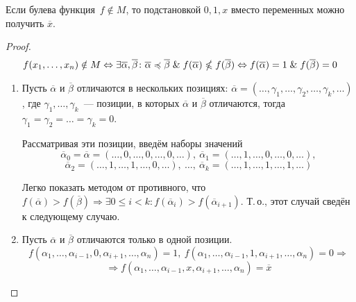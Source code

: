 \begin{lemma}
Если булева функция~$f \notin M$, то подстановкой $0, 1, x$ вместо переменных можно получить $\overline x$.
\end{lemma}
\begin{proof}
\begin{equation*}
f(x_1, \ldots, x_n) \notin M \Leftrightarrow
\exists \overline\alpha, \overline\beta \colon
\overline\alpha \preccurlyeq \overline\beta \mathrel{\&} f(\overline\alpha) \nleqslant f(\overline\beta) \Leftrightarrow
f(\overline\alpha) = 1 \mathrel{\&} f(\overline\beta) = 0
\end{equation*}
\begin{enumerate}
	\item Пусть $\overline\alpha$ и $\overline\beta$ отличаются в нескольких позициях:
	$\overline\alpha = (\ldots, \gamma_1, \ldots, \gamma_2, \ldots, \gamma_k, \ldots)$, где
	$\gamma_1, \ldots, \gamma_k$~--- позиции, в которых $\overline\alpha$ и $\overline\beta$ отличаются, тогда $\gamma_1 = \gamma_2 = \ldots = \gamma_k = 0$.
	
	Рассматривая эти позиции, введём наборы значений
	\begin{equation*}
	\overline\alpha_0 = \overline\alpha = (\ldots, 0, \ldots, 0, \ldots, 0, \ldots), \
	\overline\alpha_1 = (\ldots, 1, \ldots, 0, \ldots, 0, \ldots),
	\end{equation*}
	\begin{equation*}
	\overline\alpha_2 = (\ldots, 1, \ldots, 1, \ldots, 0, \ldots), \ \ldots, \
	\overline\alpha_k = (\ldots, 1, \ldots, 1, \ldots, 1, \ldots)
	\end{equation*}
	
	Легко показать методом от противного, что $f(\overline\alpha) > f(\overline\beta) \Rightarrow
	\exists 0 \leqslant i < k \colon f(\overline\alpha_i) > f(\overline\alpha_{i+1})$.
	Т.\,о., этот случай сведён к следующему случаю.
	
	\item Пусть $\overline\alpha$ и $\overline\beta$ отличаются только в одной позиции.
	\begin{equation*}
	f(\alpha_1, \ldots, \alpha_{i-1}, 0, \alpha_{i+1}, \ldots, \alpha_n) = 1, \
	f(\alpha_1, \ldots, \alpha_{i-1}, 1, \alpha_{i+1}, \ldots, \alpha_n) = 0 \Rightarrow
	\end{equation*}
	\begin{equation*}
	\Rightarrow f(\alpha_1, \ldots, \alpha_{i-1}, x, \alpha_{i+1}, \ldots, \alpha_n) = \overline x
	\end{equation*}
\end{enumerate}
\end{proof}

